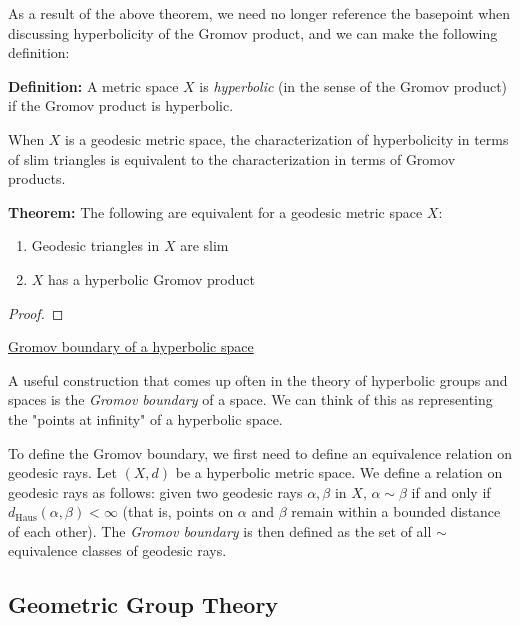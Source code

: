 \documentclass[12pt]{article}
\newcommand{\vs}{\vskip10pt}
\begin{document}
	As a result of the above theorem, we need no longer reference the basepoint when discussing hyperbolicity of the Gromov product, and we can make the following definition: 
	
	\vs 
	
	\textbf{Definition: } A metric space $X$ is \textit{hyperbolic} (in the sense of the Gromov product) if the Gromov product is hyperbolic. 
	
	\vs 
	
	When $X$ is a geodesic metric space, the characterization of hyperbolicity in terms of slim triangles is equivalent to the characterization in terms of Gromov products. 
	
	\vs 
	
	\textbf{Theorem: } The following are equivalent for a geodesic metric space $X$: 
	
	\begin{enumerate}[label = (\roman*)]
		\item Geodesic triangles in $X$ are slim
		\item $X$ has a hyperbolic Gromov product
	\end{enumerate}

	\begin{proof}
		
		
		
	\end{proof}

	\underline{Gromov boundary of a hyperbolic space}
	
	\vs 
	
	A useful construction that comes up often in the theory of hyperbolic groups and spaces is the \textit{Gromov boundary} of a space. We can think of this as representing the "points at infinity" of a hyperbolic space. 
	
	\vs 
	
	To define the Gromov boundary, we first need to define an equivalence relation on geodesic rays. Let $(X,d)$ be a hyperbolic metric space. We define a relation on geodesic rays as follows: given two geodesic rays $\alpha, \beta$ in $X$, $\alpha \sim \beta$ if and only if $d_{\text{Haus}}(\alpha, \beta) < \infty$ (that is, points on $\alpha$ and $\beta$ remain within a bounded distance of each other). The \textit{Gromov boundary} is then defined as the set of all $\sim$ equivalence classes of geodesic rays.
		
	\subsection{Geometric Group Theory}
	
\end{document}
